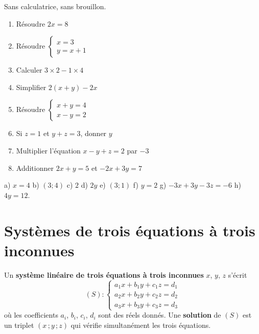 \begin{automatismes}
Sans calculatrice, sans brouillon.

\begin{enumerate}[label=\textbf{\alph*)}, leftmargin=*, itemsep=0.25em]
  \item Résoudre $2x = 8$
  \item Résoudre $\begin{cases} x=3 \\ y = x+1 \end{cases}$
  \item Calculer $3 \times 2 - 1 \times 4$
  \item Simplifier $2(x+y)-2x$
  \item Résoudre $\begin{cases} x+y=4 \\ x-y=2 \end{cases}$
  \item Si $z=1$ et $y+z=3$, donner $y$
  \item Multiplier l'équation $x-y+z=2$ par $-3$
  \item Additionner $2x+y=5$ et $-2x+3y=7$
\end{enumerate}
\end{automatismes}

\begin{corrige}[automatismes]
a) $x=4$ \quad b) $(3;4)$ \quad c) $2$ \quad d) $2y$ \quad
e) $(3;1)$ \quad f) $y=2$ \quad g) $-3x+3y-3z=-6$ \quad h) $4y=12$.
\end{corrige}

\section{Systèmes de trois équations à trois inconnues}

\begin{definition}
Un \textbf{système linéaire de trois équations à trois inconnues} $x$, $y$,
$z$ s'écrit
\[
  (S) : \begin{cases}
    a_{1}x + b_{1}y + c_{1}z = d_{1} \\
    a_{2}x + b_{2}y + c_{2}z = d_{2} \\
    a_{3}x + b_{3}y + c_{3}z = d_{3}
  \end{cases}
\]
où les coefficients $a_{i}$, $b_{i}$, $c_{i}$, $d_{i}$ sont des réels donnés.
Une \textbf{solution} de $(S)$ est un triplet $(x\,;y\,;z)$ qui vérifie
simultanément les trois équations.
\end{definition}

